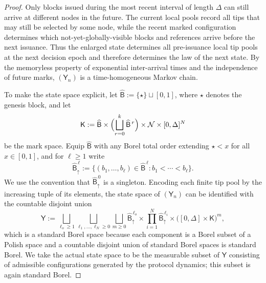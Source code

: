 \documentclass[a4paper,12pt,oneside,reqno]{amsart}
\newcommand{\Nodes}{{\mathcal N}}
\newcommand{\1}{{\mathbf 1}}
\begin{document}
\begin{proof}
Only blocks issued during the most recent interval of length $\Delta$ can still arrive at different nodes in the future. The current local pools record all tips that may still be selected by some node, while the recent marked configuration determines which not-yet-globally-visible blocks and references arrive before the next issuance. Thus the enlarged state determines all pre-issuance local tip pools at the next decision epoch and therefore determines the law of the next state. By the memoryless property of exponential inter-arrival times and the independence of future marks, $(\mathsf{Y}_n)$ is a time-homogeneous Markov chain.

To make the state space explicit, let $\widehat{\mathsf B}:=\{\star\}\sqcup [0,1]$, where $\star$ denotes the genesis block, and let
\[
   \mathsf K
   :=
   \widehat{\mathsf B}\times
   \Bigl(\bigsqcup_{r=0}^k \widehat{\mathsf B}^{\,r}\Bigr)\times
   \Nodes\times [0,\Delta]^N
\]
be the mark space. Equip $\widehat{\mathsf B}$ with any Borel total order extending $\star<x$ for all $x\in[0,1]$, and for $\ell\ge 1$ write
\[
   \widehat{\mathsf B}^{\,\ell}_{\uparrow}
   :=
   \{(b_1,\ldots,b_\ell)\in \widehat{\mathsf B}^{\,\ell}: b_1<\cdots < b_\ell\}.
\]
We use the convention that $\widehat{\mathsf B}^{\,0}_{\uparrow}$ is a singleton.
Encoding each finite tip pool by the increasing tuple of its elements, the state space of $(\mathsf{Y}_n)$ can be identified with the countable disjoint union
\[
   \mathsf Y
   :=
   \bigsqcup_{\ell_o\ge 1}
   \bigsqcup_{\ell_1,\ldots,\ell_N\ge 0}
   \bigsqcup_{m\ge 0}
   \widehat{\mathsf B}^{\,\ell_o}_{\uparrow}
   \times
   \prod_{i=1}^N \widehat{\mathsf B}^{\,\ell_i}_{\uparrow}
   \times \bigl([0,\Delta]\times \mathsf K\bigr)^m,
\]
which is a standard Borel space because each component is a Borel subset of a Polish space and a countable disjoint union of standard Borel spaces is standard Borel.
We take the actual state space to be the measurable subset of $\mathsf Y$ consisting of admissible configurations generated by the protocol dynamics; this subset is again standard Borel.


\end{proof}
\end{document}
